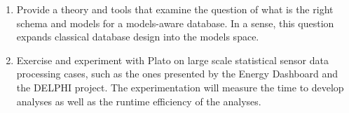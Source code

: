 \documentclass{article}
\begin{document}
\begin{enumerate}
%  
\item Provide a theory and tools that examine the question of what is the right schema and models for a models-aware database. In a sense, this question expands classical database design into the models space.
%
\item Exercise and experiment with Plato on large scale statistical sensor data processing cases, such as the ones presented by the Energy Dashboard and the DELPHI project. The experimentation will measure the time to develop analyses as well as the runtime efficiency of the analyses.
%
\end{enumerate}
\end{document}
